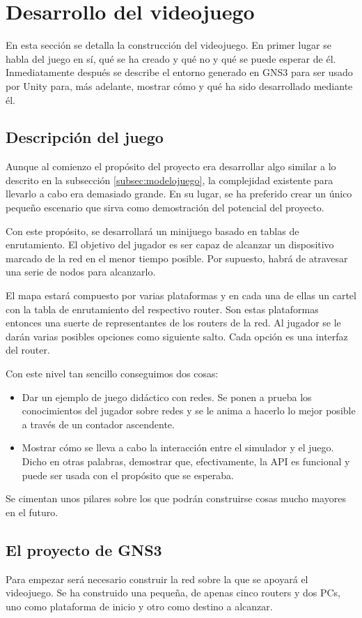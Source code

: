 \section{Desarrollo del videojuego}
En esta sección se detalla la construcción del videojuego. En primer lugar se habla del juego en sí, qué se ha creado y qué no y qué se puede esperar de él. Inmediatamente después se describe el entorno generado en GNS3 para ser usado por Unity para, más adelante, mostrar cómo y qué ha sido desarrollado mediante él.

\subsection{Descripción del juego}
Aunque al comienzo el propósito del proyecto era desarrollar algo similar a lo descrito en la subsección \ref{subsec:modelojuego}, la complejidad existente para llevarlo a cabo era demasiado grande. En su lugar, se ha preferido crear un único pequeño escenario que sirva como demostración del potencial del proyecto.

Con este propósito, se desarrollará un minijuego basado en tablas de enrutamiento. El objetivo del jugador es ser capaz de alcanzar un dispositivo marcado de la red en el menor tiempo posible. Por supuesto, habrá de atravesar una serie de nodos para alcanzarlo.

El mapa estará compuesto por varias plataformas y en cada una de ellas un cartel con la tabla de enrutamiento del respectivo router. Son estas plataformas entonces una suerte de representantes de los routers de la red. Al jugador se le darán varias posibles opciones como siguiente salto. Cada opción es una interfaz del router.

Con este nivel tan sencillo conseguimos dos cosas:
\begin{itemize}
\item Dar un ejemplo de juego didáctico con redes. Se ponen a prueba los conocimientos del jugador sobre redes y se le anima a hacerlo lo mejor posible a través de un contador ascendente.
\item Mostrar cómo se lleva a cabo la interacción entre el simulador y el juego. Dicho en otras palabras, demostrar que, efectivamente, la API es funcional y puede ser usada con el propósito que se esperaba.
\end{itemize}

Se cimentan unos pilares sobre los que podrán construirse cosas mucho mayores en el futuro.

\subsection{El proyecto de GNS3}
Para empezar será necesario construir la red sobre la que se apoyará el videojuego. Se ha construido una pequeña, de apenas cinco routers y dos PCs, uno como plataforma de inicio y otro como destino a alcanzar.

